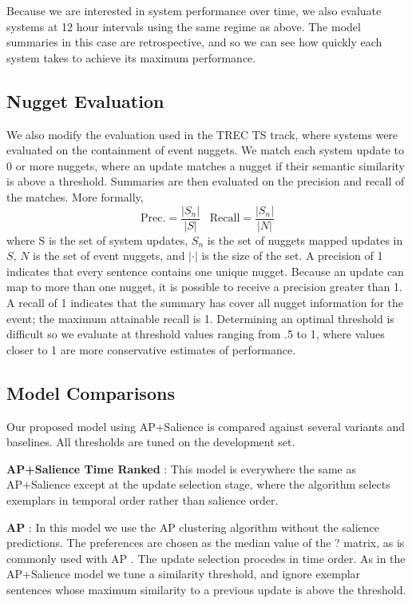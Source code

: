 Because we are interested in system performance over time, we also evaluate 
systems at 12 hour intervals using the same regime as above. 
The model summaries in this case are retrospective, and so we can see how quickly
each system takes to achieve its maximum performance.

\subsection{Nugget Evaluation}
We also modify the evaluation used in the TREC TS track, 
where systems were evaluated on the containment of event nuggets. 
We match each system update to 0 or more nuggets, where an update matches
a nugget if their semantic similarity is above a threshold.  
Summaries are then evaluated on the precision and recall of the matches.
More formally,
\[ \mathrm{Prec.} = \frac{|S_n|}{|S|} \;\;\; \mathrm{Recall} = \frac{|S_n|}{|N|}\] 
where S is the set of system updates, $S_n$ is the set of nuggets mapped updates in $S$,
$N$ is the set of event nuggets, and $|\cdot|$ is the size of the set.
A precision of 1 indicates that every sentence contains one unique nugget.
Because an update can map to more than one nugget, it is possible to receive a precision greater than 1. 
A recall of 1 indicates that the summary has cover all nugget information for the event; the maximum
attainable recall is 1.
Determining 
an optimal threshold is difficult so we evaluate at threshold values ranging
from .5 to 1, where values closer to 1 are more conservative estimates of
performance. 


\subsection{Model Comparisons}

Our proposed model using AP+Salience is compared against several variants and baselines. All thresholds
are tuned on the development set.

\textbf{AP+Salience Time Ranked} : This model is everywhere the same as AP+Salience except at the update selection stage, 
where the algorithm selects exemplars in temporal order rather than salience order. 

\textbf{AP} : In this model we use the AP clustering algorithm without the salience predictions.
The preferences are chosen as the median value of the ? matrix, as is commonly used with AP \cite{?}.
The update selection procedes in time order. As in the AP+Salience model we tune a similarity threshold,
and ignore exemplar sentences whose maximum similarity to a previous update is above the threshold.

